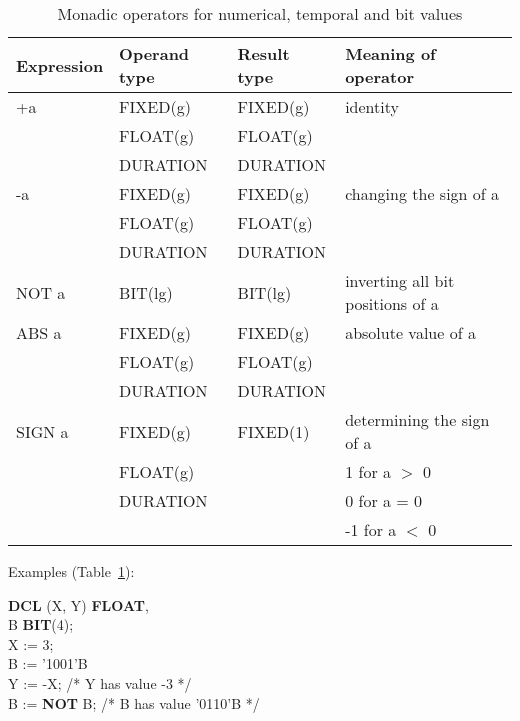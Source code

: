 \begin{table} %
\begin{center}
\caption{Monadic operators for numerical, temporal and bit values}
\label{tab_monadic_numeric_temp_bit}
\vspace{5mm}
\begin{tabular}{|l|l|l|l|} 
\hline
{\bf Expression} & {\bf Operand type} & {\bf Result type} & {\bf Meaning of operator}\\ \hline

+a               & FIXED(g)          & FIXED(g)         & identity\\
                 & FLOAT(g)          & FLOAT(g)         & \\
                 & DURATION          & DURATION         & \\ \hline

-a               & FIXED(g)          & FIXED(g)         & changing the sign of a\\
                 & FLOAT(g)          & FLOAT(g)         & \\
                 & DURATION          & DURATION         & \\ \hline

NOT a            & BIT(lg)           & BIT(lg)          & inverting all bit positions of a\\ \hline

ABS a            & FIXED(g)          & FIXED(g)         & absolute value of a\\
                 & FLOAT(g)          & FLOAT(g)         & \\
                 & DURATION          & DURATION         & \\ \hline

SIGN a           & FIXED(g)          & FIXED(1)         & determining the sign of a\\ 
                 & FLOAT(g)          &                  & 1 for a $>$ 0\\
                 & DURATION          &                  & 0 for a = 0\\   
                 &                   &                  & -1 for a $<$ 0\\
\hline
\end{tabular}
\end{center}
\end{table}

Examples (Table~\ref{tab_monadic_numeric_temp_bit}):

\begin{tabbing}
{\bf DCL} (X, Y) \= {\bf FLOAT},  \= \\
\x        B      \> {\bf BIT}(4); \> \\
X := 3;            \> \> \\
B := '1001'B       \> \> \\
Y := -X;           \> \> /* Y has value -3 */\\
B := {\bf NOT} B;  \> \> /* B has value '0110'B */\\
\end{tabbing}

